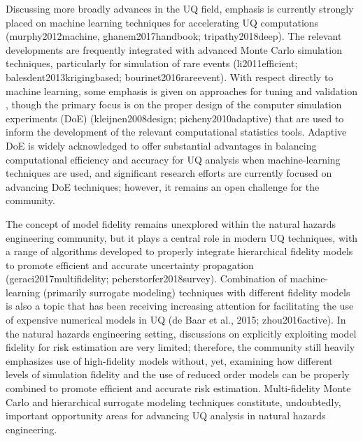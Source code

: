Discussing more broadly advances in the UQ field, emphasis is currently strongly placed on machine learning techniques for accelerating UQ computations (murphy2012machine, ghanem2017handbook; tripathy2018deep). The relevant developments are frequently integrated with advanced Monte Carlo simulation techniques, particularly for simulation of rare events (li2011efficient; balesdent2013krigingbased; bourinet2016rareevent). With respect directly to machine learning, some emphasis is given on approaches for tuning and validation \citep{mehmani2018concurrent}, though the primary focus is on the proper design of the computer simulation experiments (DoE) (kleijnen2008design; picheny2010adaptive) that are used to inform the development of the relevant computational statistics tools. Adaptive DoE is widely acknowledged to offer substantial advantages in balancing computational efficiency and accuracy for UQ analysis when machine-learning techniques are used, and significant research efforts are currently focused on advancing DoE techniques; however, it remains an open challenge for the community. 

The concept of model fidelity remains unexplored within the natural hazards engineering community, but it plays a central role in modern UQ techniques, with a range of algorithms developed to properly integrate hierarchical fidelity models to promote efficient and accurate uncertainty propagation (geraci2017multifidelity; peherstorfer2018survey). Combination of machine-learning (primarily surrogate modeling) techniques with different fidelity models is also a topic that has been receiving increasing attention for facilitating the use of expensive numerical models in UQ (de Baar et al., 2015; zhou2016active). In the natural hazards engineering setting, discussions on explicitly exploiting model fidelity for risk estimation are very limited; therefore, the community still heavily emphasizes use of high-fidelity models without, yet, examining how different levels of simulation fidelity and the use of reduced order models can be properly combined to promote efficient and accurate risk estimation. Multi-fidelity Monte Carlo and hierarchical surrogate modeling techniques constitute, undoubtedly, important opportunity areas for advancing UQ analysis in natural hazards engineering.

